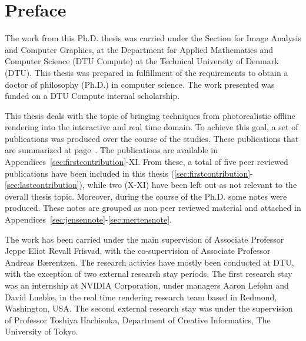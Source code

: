\chapter{Preface}

The work from this Ph.D. thesis was carried under the Section for Image Analysis and Computer Graphics, at the Department for Applied Mathematics and Computer Science (DTU Compute) at the Technical University of Denmark (DTU). This thesis was prepared in fulfillment of the requirements to obtain a doctor of philosophy (Ph.D.) in computer science. The work presented was funded on a DTU Compute internal scholarship. 

This thesis deals with the topic of bringing techniques from photorealistic offline rendering into the interactive and real time domain. To achieve this goal, a set of publications was produced over the course of the studies. These publications that are summarized at page~\pageref{sec:contributionlist}. The publications are available in Appendices~\ref{sec:firstcontribution}-XI. From these, a total of five peer reviewed publications have been included in this thesis (\ref{sec:firstcontribution}-\ref{sec:lastcontribution}), while two (X-XI) have been left out as not relevant to the overall thesis topic. Moreover, during the course of the Ph.D. some notes were produced. These notes are grouped as non peer reviewed material and attached in Appendices~\ref{sec:jensennote}-\ref{sec:mertensnote}. 

The work has been carried under the main supervision of Associate Professor Jeppe Eliot Revall Frisvad, with the co-supervision of Associate Professor Andreas B\ae rentzen. The research activies have mostly been conducted at DTU, with the exception of two external research stay periods. The first research stay was an internship at NVIDIA Corporation, under managers Aaron Lefohn and David Luebke, in the real time rendering research team based in Redmond, Washington, USA. The second external research stay was under the supervision of Professor Toshiya Hachisuka, Department of Creative Informatics, The University of Tokyo.

